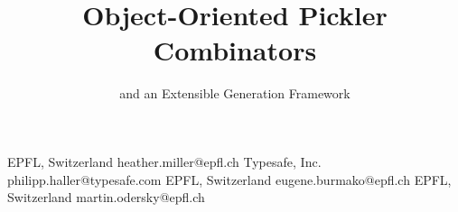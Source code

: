 \documentclass[10pt]{sigplanconf}
\theoremstyle{definition}
\theoremstyle{definition}
\begin{document}
\setmainfont[Mapping=tex-text]{Times New Roman}
\setmonofont[Scale=0.8,BoldFont={Consolas Bold}]{Consolas}



\title{Object-Oriented Pickler Combinators}
\subtitle{and an Extensible Generation Framework}

           {EPFL, Switzerland}
           {heather.miller@epfl.ch}
           {Typesafe, Inc.}
           {philipp.haller@typesafe.com}
           {EPFL, Switzerland}
           {eugene.burmako@epfl.ch}
           {EPFL, Switzerland}
           {martin.odersky@epfl.ch}

\maketitle
\end{document}
